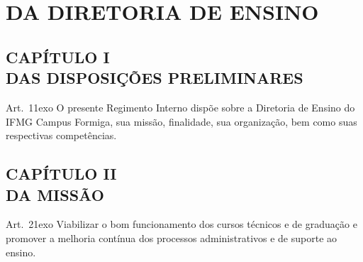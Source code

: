 \documentclass[a4paper,12pt]{report}
\newcommand{\ORD}[2]{#1\raise1ex\hbox{\scriptsize#2}}
\begin{document}
\tableofcontents

\renewcommand*{\chaptername}{TÍTULO}
\chapter{DA DIRETORIA DE ENSINO}
\setcounter{page}{1}


\section{CAPÍTULO I \\ DAS DISPOSIÇÕES PRELIMINARES}

Art.~\ORD{1}{o} O presente Regimento Interno dispõe sobre a Diretoria de Ensino do IFMG Campus Formiga, sua missão, 
finalidade, sua organização, bem como suas respectivas competências.


\section{CAPÍTULO II \\ DA MISSÃO}

Art.~\ORD{2}{o} Viabilizar o bom funcionamento dos cursos técnicos e de graduação e promover a melhoria contínua dos processos administrativos e de suporte ao ensino.

\end{document}
